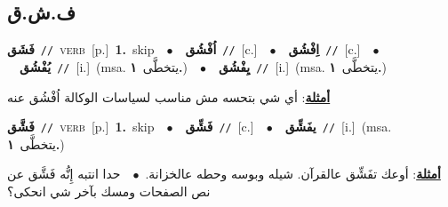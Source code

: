 \documentclass[10pt,a4paper,twoside]{article} %
\begin{document}
\begin{multicols}{2}
\vspace{-3mm}
\subsection*{\color{blue}\foreignlanguage{arabic}{ف.ش.ق}\color{blue}{}} 

{\setlength\topsep{0pt}\textbf{\foreignlanguage{arabic}{فَشَق}}\ {\color{gray}\texttt{//}\color{black}}\ \textsc{verb}\ [p.]\ \textbf{1.}~skip\ \ $\bullet$\ \ \setlength\topsep{0pt}\textbf{\foreignlanguage{arabic}{اُفْشُق}}\ {\color{gray}\texttt{//}\color{black}}\ [c.]\ \ $\bullet$\ \ \setlength\topsep{0pt}\textbf{\foreignlanguage{arabic}{اِفْشُق}}\ {\color{gray}\texttt{//}\color{black}}\ [c.]\ \ $\bullet$\ \ \setlength\topsep{0pt}\textbf{\foreignlanguage{arabic}{يُفْشُق}}\ {\color{gray}\texttt{//}\color{black}}\ [i.]\ \color{gray}(msa. \foreignlanguage{arabic}{يتخطَّى}~\foreignlanguage{arabic}{\textbf{١.}})\color{black}\ \ $\bullet$\ \ \setlength\topsep{0pt}\textbf{\foreignlanguage{arabic}{يِفْشُق}}\ {\color{gray}\texttt{//}\color{black}}\ [i.]\ \color{gray}(msa. \foreignlanguage{arabic}{يتخطَّى}~\foreignlanguage{arabic}{\textbf{١.}})\color{black}\  \begin{flushright}\color{gray}\foreignlanguage{arabic}{\textbf{\underline{\foreignlanguage{arabic}{أمثلة}}}: أي شي بتحسه مش مناسب لسياسات الوكالة اُفْشُق عنه}\end{flushright}\color{black}} \vspace{2mm}

{\setlength\topsep{0pt}\textbf{\foreignlanguage{arabic}{فَشَّق}}\ {\color{gray}\texttt{//}\color{black}}\ \textsc{verb}\ [p.]\ \textbf{1.}~skip\ \ $\bullet$\ \ \setlength\topsep{0pt}\textbf{\foreignlanguage{arabic}{فَشِّق}}\ {\color{gray}\texttt{//}\color{black}}\ [c.]\ \ $\bullet$\ \ \setlength\topsep{0pt}\textbf{\foreignlanguage{arabic}{يفَشِّق}}\ {\color{gray}\texttt{//}\color{black}}\ [i.]\ \color{gray}(msa. \foreignlanguage{arabic}{يتخطَّى}~\foreignlanguage{arabic}{\textbf{١.}})\color{black}\  \begin{flushright}\color{gray}\foreignlanguage{arabic}{\textbf{\underline{\foreignlanguage{arabic}{أمثلة}}}: أوعك تفَشِّق عالقرآن. شيله وبوسه وحطه عالخزانة.\ $\bullet$\ \  حدا انتبه إِنُّه فَشَّق عن نص الصفحات ومسك بآخر شي انحكى؟}\end{flushright}\color{black}} \vspace{2mm}


\end{multicols}
\end{document}

